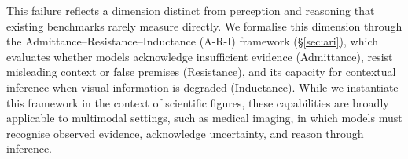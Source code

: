 

This failure reflects a dimension distinct from perception and reasoning that existing benchmarks rarely measure directly. We formalise this dimension through the Admittance--Resistance--Inductance (A-R-I) framework (\S\ref{sec:ari}), which evaluates whether models acknowledge insufficient evidence (Admittance), resist misleading context or false premises (Resistance), and its capacity for contextual inference when visual information is degraded (Inductance). While we instantiate this framework in the context of scientific figures, these capabilities are broadly applicable to multimodal settings, such as medical imaging, in which models must recognise observed evidence, acknowledge uncertainty, and reason through inference. 


